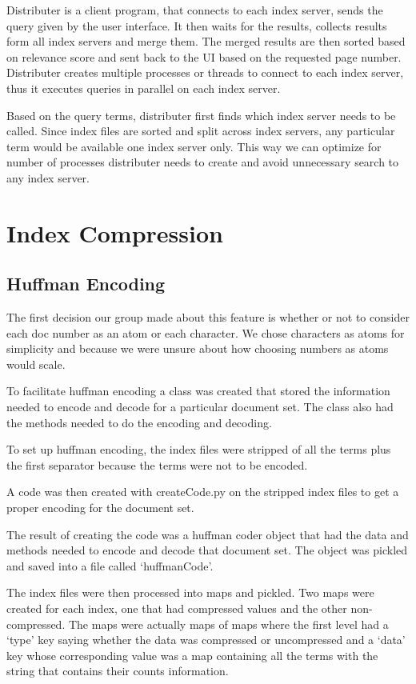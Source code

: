 \documentclass[letterpaper,11pt,twoside]{article}
\begin{document}
Distributer is a client program, that connects to each index server, sends the query given by the user interface. It then waits for the results, collects results form all index servers and merge them. The merged results are then sorted based on relevance score and sent back to the UI based on the requested page number. Distributer creates multiple processes or threads to connect to each index server, thus it executes queries in parallel on each index server. 

Based on the query terms, distributer first finds which index server needs to be called. Since index files are sorted and split across index servers, any particular term would be available one index server only. This way we can optimize for number of processes distributer needs to create and avoid unnecessary search to any index server. 

\section{Index Compression}

\subsection{Huffman Encoding}
The first decision our group made about this feature is whether or not to consider each doc number as an atom or each character. We chose characters as atoms for simplicity and because we were unsure about how choosing numbers as atoms would scale.

To facilitate huffman encoding a class was created that stored the information needed to encode and decode for a particular document set. The class also had the methods needed to do the encoding and decoding.

To set up huffman encoding, the index files were stripped of all the terms plus the first separator because the terms were not to be encoded.

A code was then created with createCode.py on the stripped index files to get a proper encoding for the document set.

The result of creating the code was a huffman coder object that had the data and methods needed to encode and decode that document set. The object was pickled and saved into a file called `huffmanCode'.

The index files were then processed into maps and pickled. Two maps were created for each index, one that had compressed values and the other non-compressed. The maps were actually maps of maps where the first level had a `type' key saying whether the data was compressed or uncompressed and a `data' key whose corresponding value was a map containing all the terms with the string that contains their counts information.
\end{document}
